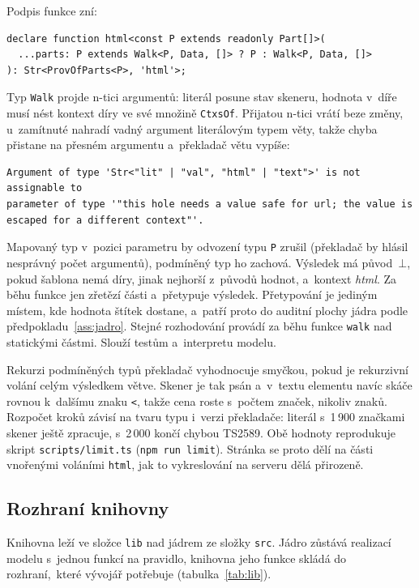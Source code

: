 Podpis funkce zní:

\begin{verbatim}
declare function html<const P extends readonly Part[]>(
  ...parts: P extends Walk<P, Data, []> ? P : Walk<P, Data, []>
): Str<ProvOfParts<P>, 'html'>;
\end{verbatim}

\noindent
Typ \texttt{Walk} projde n-tici argumentů: literál posune stav skeneru, hodnota v~díře musí nést kontext díry ve své množině \texttt{CtxsOf}. Přijatou n-tici vrátí beze změny, u~zamítnuté nahradí vadný argument literálovým typem věty, takže chyba přistane na přesném argumentu a~překladač větu vypíše:

\begin{verbatim}
Argument of type 'Str<"lit" | "val", "html" | "text">' is not assignable to
parameter of type '"this hole needs a value safe for url; the value is
escaped for a different context"'.
\end{verbatim}

\noindent
Mapovaný typ v~pozici parametru by odvození typu \texttt{P} zrušil (překladač by hlásil nesprávný počet argumentů), podmíněný typ ho zachová. Výsledek má původ~$\bot$, pokud šablona nemá díry, jinak nejhorší z~původů hodnot, a~kontext \emph{html}. Za běhu funkce jen zřetězí části a~přetypuje výsledek. Přetypování je jediným místem, kde hodnota štítek dostane, a~patří proto do auditní plochy jádra podle předpokladu~\ref{ass:jadro}. Stejné rozhodování provádí za běhu funkce \texttt{walk} nad statickými částmi. Slouží testům a~interpretu modelu.

Rekurzi podmíněných typů překladač vyhodnocuje smyčkou, pokud je rekurzivní volání celým výsledkem větve. Skener je tak psán a~v~textu elementu navíc skáče rovnou k~dalšímu znaku \texttt{<}, takže cena roste s~počtem značek, nikoliv znaků. Rozpočet kroků závisí na tvaru typu i~verzi překladače: literál s~1\,900 značkami skener ještě zpracuje, s~2\,000 končí chybou TS2589. Obě hodnoty reprodukuje skript \texttt{scripts/limit.ts} (\texttt{npm run limit}). Stránka se proto dělí na části vnořenými voláními \texttt{html}, jak to vykreslování na serveru dělá přirozeně.

\subsection{Rozhraní knihovny}
\label{sec:lib-rozhrani}

Knihovna leží ve složce \texttt{lib} nad jádrem ze složky \texttt{src}. Jádro zůstává realizací modelu s~jednou funkcí na pravidlo, knihovna jeho funkce skládá do rozhraní,~které vývojář potřebuje (tabulka~\ref{tab:lib}).

